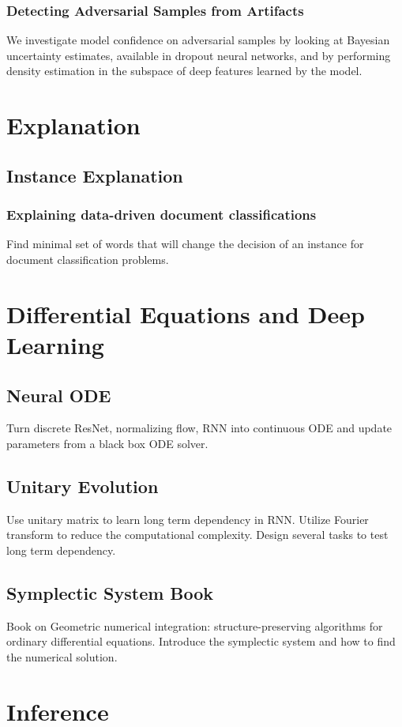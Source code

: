 \documentclass[10pt,a4paper]{article}
\begin{document}
\subsubsection{Detecting Adversarial Samples from Artifacts\cite{feinman2017detecting}}
We investigate model confidence on adversarial samples by looking at Bayesian uncertainty estimates, available in dropout neural networks, and by performing density estimation in the subspace of deep features learned by the model.
\section{Explanation}
\subsection{Instance Explanation}
\subsubsection{	
Explaining data-driven document classifications \cite{martens2013explaining}}
Find minimal set of words that will change the decision of an instance for document classification problems.
\section{Differential Equations and Deep Learning}
\subsection{Neural ODE \cite{chen2018neural}}
Turn discrete ResNet, normalizing flow, RNN into continuous ODE and update parameters from a black box ODE solver.
\subsection{Unitary Evolution \cite{arjovsky2016unitary}}
Use unitary matrix to learn long term dependency in RNN. Utilize Fourier transform to reduce the computational complexity. Design several tasks to test long term dependency.
\subsection{Symplectic System Book \cite{hairer2006geometric}}
Book on Geometric numerical integration: structure-preserving algorithms for ordinary differential equations. Introduce the symplectic system and how to find the numerical solution.
\section{Inference}
\end{document}
